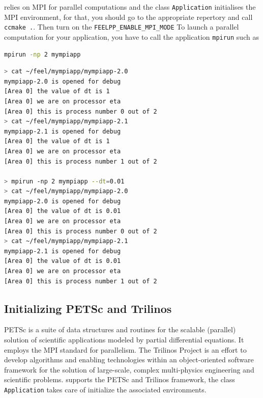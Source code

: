 \feel relies on MPI for parallel computations and the class
\lstinline!Application!  initialises the MPI environment, for that, you should go to the appropriate repertory and call \lstinline!ccmake .!. Then turn on the \lstinline!FEELPP_ENABLE_MPI_MODE!
To launch a parallel computation for your application, you have to call the application \verb|mpirun| such as
\begin{lstlisting}[language=sh]
mpirun -np 2 mympiapp
\end{lstlisting}

\begin{lstlisting}[language=sh]
> cat ~/feel/mympiapp/mympiapp-2.0
mympiapp-2.0 is opened for debug
[Area 0] the value of dt is 1
[Area 0] we are on processor eta
[Area 0] this is process number 0 out of 2
> cat ~/feel/mympiapp/mympiapp-2.1
mympiapp-2.1 is opened for debug
[Area 0] the value of dt is 1
[Area 0] we are on processor eta
[Area 0] this is process number 1 out of 2

> mpirun -np 2 mympiapp --dt=0.01
> cat ~/feel/mympiapp/mympiapp-2.0
mympiapp-2.0 is opened for debug
[Area 0] the value of dt is 0.01
[Area 0] we are on processor eta
[Area 0] this is process number 0 out of 2
> cat ~/feel/mympiapp/mympiapp-2.1
mympiapp-2.1 is opened for debug
[Area 0] the value of dt is 0.01
[Area 0] we are on processor eta
[Area 0] this is process number 1 out of 2
\end{lstlisting}


\subsection{Initializing PETSc and Trilinos}


PETSc is a suite of data structures and routines for the scalable (parallel) solution of scientific applications modeled by partial differential equations. It employs the MPI standard for parallelism.  \newline \newline The Trilinos Project is an effort to develop algorithms and enabling technologies within an object-oriented software framework for the solution of large-scale, complex multi-physics engineering and scientific problems. \newline \newline
\feel supports the PETSc and Trilinos framework, the class \lstinline!Application! takes care of initialize the associated environments. \newline


